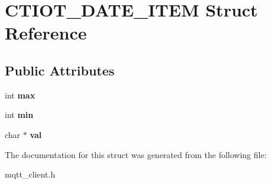 \hypertarget{struct_c_t_i_o_t___d_a_t_e___i_t_e_m}{}\section{C\+T\+I\+O\+T\+\_\+\+D\+A\+T\+E\+\_\+\+I\+T\+EM Struct Reference}
\label{struct_c_t_i_o_t___d_a_t_e___i_t_e_m}
\subsection*{Public Attributes}
\begin{DoxyCompactItemize}
\item 
\mbox{\label{struct_c_t_i_o_t___d_a_t_e___i_t_e_m_a7a5c762e6a6be757a4c39049a819d124}} 
int {\bfseries max}
\item 
\mbox{\label{struct_c_t_i_o_t___d_a_t_e___i_t_e_m_a98b5f20d2b70e647db790541f9c3dd8d}} 
int {\bfseries min}
\item 
\mbox{\label{struct_c_t_i_o_t___d_a_t_e___i_t_e_m_a5434c06a119f01c9dbcc6c497d3b1d8f}} 
char $\ast$ {\bfseries val}
\end{DoxyCompactItemize}


The documentation for this struct was generated from the following file\+:\begin{DoxyCompactItemize}
\item 
mqtt\+\_\+client.\+h\end{DoxyCompactItemize}
